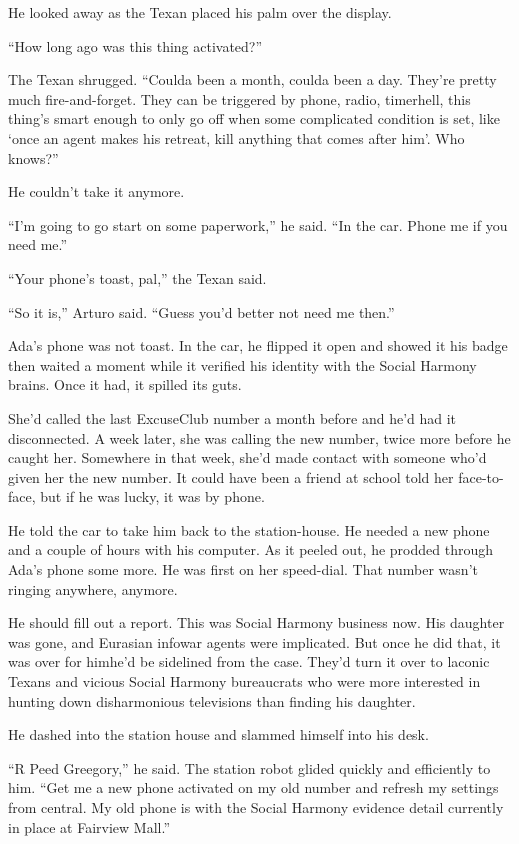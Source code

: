 He looked away as the Texan placed his palm over the display.

“How long ago was this thing activated?”

The Texan shrugged. “Coulda been a month, coulda been a day.
They’re pretty much fire-and-forget. They can be triggered by
phone, radio, timer{\dash}hell, this thing’s smart enough to only go off
when some complicated condition is set, like ‘once an agent makes
his retreat, kill anything that comes after him’. Who knows?”

He couldn’t take it anymore.

“I’m going to go start on some paperwork,” he said. “In the car.
Phone me if you need me.”

“Your phone’s toast, pal,” the Texan said.

“So it is,” Arturo said. “Guess you’d better not need me then.”

\tb

Ada’s phone was not toast. In the car, he flipped it open and
showed it his badge then waited a moment while it verified his
identity with the Social Harmony brains. Once it had, it spilled
its guts.

She’d called the last ExcuseClub number a month before and he’d had
it disconnected. A week later, she was calling the new number,
twice more before he caught her. Somewhere in that week, she’d made
contact with someone who’d given her the new number. It could have
been a friend at school told her face-to-face, but if he was lucky,
it was by phone.

He told the car to take him back to the station-house. He needed a
new phone and a couple of hours with his computer. As it peeled
out, he prodded through Ada’s phone some more. He was first on her
speed-dial. That number wasn’t ringing anywhere, anymore.

He should fill out a report. This was Social Harmony business now.
His daughter was gone, and Eurasian infowar agents were implicated.
But once he did that, it was over for him{\dash}he’d be sidelined from
the case. They’d turn it over to laconic Texans and vicious Social
Harmony bureaucrats who were more interested in hunting down
disharmonious televisions than finding his daughter.

He dashed into the station house and slammed himself into his
desk.

“R Peed Greegory,” he said. The station robot glided quickly and
efficiently to him. “Get me a new phone activated on my old number
and refresh my settings from central. My old phone is with the
Social Harmony evidence detail currently in place at Fairview
Mall.”

